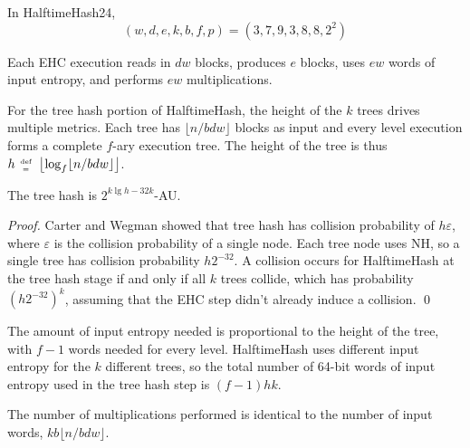 \documentclass{llncs}
\newcommand{\defeq}{\;\genfrac{}{}{0pt}{2}{\text{def}}{=}\;}
\begin{document}
In HalftimeHash24, \[(w, d, e, k, b, f, p) = (3, 7, 9, 3, 8, 8, 2^2)\]

Each EHC execution reads in $d w$ blocks, produces $e$ blocks, uses $e w$ words of input entropy, and performs $e w$ multiplications.

For the tree hash portion of HalftimeHash, the height of the $k$ trees drives multiple metrics.
Each tree has $\lfloor n / b d w \rfloor$ blocks as input and every level execution forms a complete $f$-ary execution tree.
The height of the tree is thus $h \defeq \left\lfloor \log_f \lfloor n / b d w \rfloor \right\rfloor$.

\begin{lemma}
The tree hash is $2^{ k\lg h - 32k}$-AU.
\end{lemma}
\begin{proof}
  Carter and Wegman showed that tree hash has collision probability of $h \varepsilon$, where $\varepsilon$ is the collision probability of a single node.
  Each tree node uses NH, so a single tree has collision probability $h 2^{-32}$.
  A collision occurs for HalftimeHash at the tree hash stage if and only if all $k$ trees collide, which has probability $\left(h 2^{-32}\right)^k$, assuming that the EHC step didn't already induce a collision. \qed
\end{proof}

The amount of input entropy needed is proportional to the height of the tree, with $f - 1$ words needed for every level.
HalftimeHash uses different input entropy for the $k$ different trees, so the total number of 64-bit words of input entropy used in the tree hash step is $(f - 1) h k$.

The number of multiplications performed is identical to the number of input words, $k b \lfloor n / b d w \rfloor$.

\end{document}
